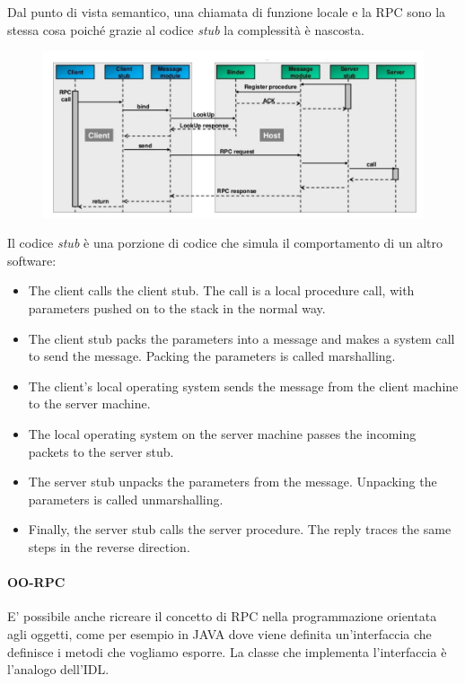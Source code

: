 \documentclass{article}
\providecommand{\tightlist}{%
		  \setlength{\itemsep}{0pt}\setlength{\parskip}{0pt}}
\begin{document}
		Dal punto di vista semantico, una chiamata di funzione locale e la RPC sono la stessa cosa poiché grazie al codice \emph{stub} la complessità è nascosta.
		
		\begin{figure}[ht]
			\centering
			\includegraphics[width=0.7\linewidth]{SAC_A3_rpc}

			\label{fig:saca3rpc}
		\end{figure}

		Il codice \emph{stub} è una porzione di codice che simula il comportamento di un altro software:
		\begin{itemize}
		\tightlist
			\item  The client calls the client stub. The call is a local procedure call, with parameters pushed on to the stack in the normal way.
			\item The client stub packs the parameters into a message and makes a system call to send the message. Packing the parameters is called marshalling.
			\item The client's local operating system sends the message from the client machine to the server machine.
			\item The local operating system on the server machine passes the incoming packets to the server stub.
			\item The server stub unpacks the parameters from the message. Unpacking the parameters is called unmarshalling.
			\item Finally, the server stub calls the server procedure. The reply traces the same steps in the reverse direction.
		\end{itemize}
		
		\paragraph{OO-RPC}
		E' possibile anche ricreare il concetto di RPC nella programmazione orientata agli oggetti, come per esempio in JAVA dove viene definita un'interfaccia che definisce i metodi che vogliamo esporre. La classe che implementa l'interfaccia è l'analogo dell'IDL. 
		
\end{document}
